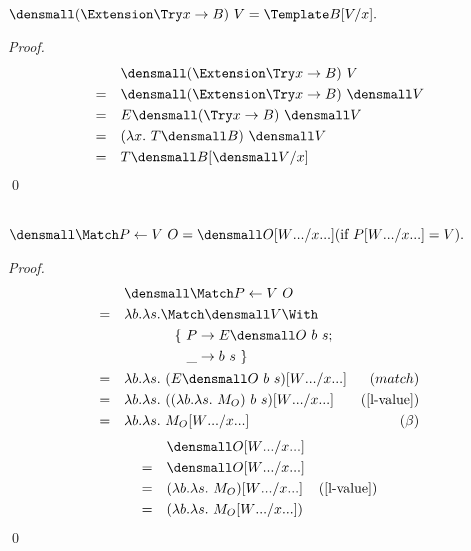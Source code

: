 \begin{lemma}
  \label{thm:ext-try}
    $ \den{(\Extension \Try x \to B) ~ V} = \Template B\subst{x}{V}.$
\end{lemma}
    \begin{proof}
        \begin{align*}
            &\quad \den{(\Extension \Try x \to B) ~ V}  \\
            =& \quad \den{(\Extension \Try x \to B)} ~ \den{V}\\
            =& \quad E\den{(\Try x \to B)} ~ \den{V}\\
            =& \quad (\lambda x. ~T\den{B}) ~ \den{V}\\
            =& \quad T\den{B}\subst{x}{\den{V}}
        \end{align*}
        \qed
    \end{proof}

\begin{lemma}
  \label{thm:try-match}
  \\
  $ \den{\Match P \gets V ~ O} = \den{O\subst{\many{x}}{\many{W}}} (\text{if } P\subst{\many{x}}{\many{W}} = V).$
\end{lemma}
    \begin{proof}
        \begin{align*}
            &\quad \den{\Match P \gets V ~ O}  \\
            =&\quad \lambda b. \lambda s.
            \begin{aligned}[t]
              &\Match \den{V} \With \\
              &\quad
              \begin{aligned}[t]
                \{~
                P &\to E\den{O}~b~s; \\
                \_ &\to b~s
                ~\}
              \end{aligned}
            \end{aligned}  \\
            =&\quad  \lambda b. \lambda s.~(E\den{O}~b~s)\subst{\many{x}}{\many{W}}  & (match) \\
            =&\quad  \lambda b. \lambda s.~((\lambda b. \lambda s. ~M_O)~b~s)\subst{\many{x}}{\many{W}}  & (\cref{l-value}) \\
            =&\quad  \lambda b. \lambda s.~M_O\subst{\many{x}}{\many{W}}  & (\beta)
        \end{align*}
        \begin{align*}
            &\quad \den{O\subst{\many{x}}{\many{W}}}  \\
            =& \quad \den{O}\subst{\many{x}}{\many{W}} \\
            =& \quad (\lambda b. \lambda s. ~M_O)\subst{\many{x}}{\many{W}} & (\cref{l-value}) \\
            =& \quad (\lambda b. \lambda s. ~M_O\subst{\many{x}}{\many{W}}) 
        \end{align*}
        \qed
    \end{proof}


